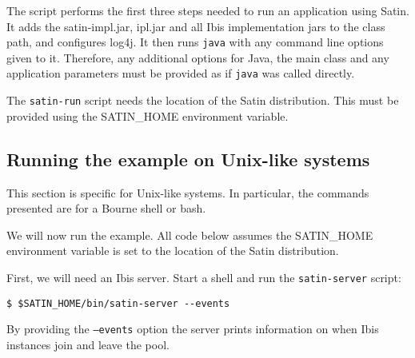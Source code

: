 \documentclass[a4paper,10pt]{article}
\begin{document}
The script performs the first three steps needed to run an application
using Satin. It adds the satin-impl.jar, ipl.jar and all Ibis implementation
jars to the class path, and configures log4j.
It then runs \texttt{java} with any
command line options given to it. Therefore, any additional options for
Java, the main class and any application parameters must be provided as
if \texttt{java} was called directly.

The \texttt{satin-run} script needs the location of the Satin
distribution. This must be provided using the SATIN\_HOME environment
variable.

\subsection{Running the example on Unix-like systems}

This section is specific for Unix-like systems. In particular, the
commands presented are for a Bourne shell or bash.

We will now run the example. All code below assumes the SATIN\_HOME
environment variable is set to the location of the Satin distribution.

First, we will need an Ibis server. Start a shell and
run the \texttt{satin-server} script:
\noindent
{\small
\begin{verbatim}
$ $SATIN_HOME/bin/satin-server --events
\end{verbatim}
}
\noindent

By providing the \texttt{--events} option the server
prints information on when Ibis instances join and leave the pool.
\end{document}
